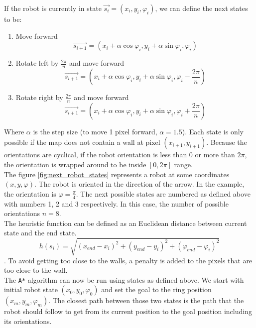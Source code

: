 \documentclass[12pt,a4paper]{article}
\begin{document}
	If the robot is currently in state $\vec{s_i} = (x_i, y_i, \varphi_i)$, we can define the next states to be:
	
	\begin{enumerate}
		\item Move forward
		$$\vec{s_{i+1}} = (x_i + \alpha \cos \varphi_i, y_i + \alpha \sin \varphi_i, \varphi_i)$$
		\item Rotate left by $\frac{2\pi}{n}$ and move forward
		$$\vec{s_{i+1}} = (x_i + \alpha \cos \varphi_i, y_i + \alpha \sin \varphi_i, \varphi_i - \frac{2\pi}{n})$$
		\item Rotate right by $\frac{2\pi}{n}$ and move forward
		$$\vec{s_{i+1}} = (x_i + \alpha \cos \varphi_i, y_i + \alpha \sin \varphi_i, \varphi_i + \frac{2\pi}{n})$$
	\end{enumerate}
	
	Where $\alpha$ is the step size (to move 1 pixel forward, $\alpha = 1.5$). Each state is only possible if the map does not contain a wall at pixel $(x_{i+1}, y_{i+1})$. Because the orientations are cyclical, if the robot orientation is less than $0$ or more than $2\pi$, the orientation is wrapped around to be inside $[0, 2\pi]$ range. \\
	
	The figure \ref{fig:next_robot_states} represents a robot at some coordinates $(x, y, \varphi)$. The robot is oriented in the direction of the arrow. In the example, the orientation is $\varphi = \frac{\pi}{4}$. The next possible states are numbered as defined above with numbers 1, 2 and 3 respectively. In this case, the number of possible orientations $n = 8$. \\
	
	The heuristic function can be defined as an Euclidean distance between current state and the end state. $$h(s_i) = \sqrt{(x_{end} - x_i)^2 + (y_{end} - y_i)^2 + (\varphi_{end} - \varphi_i)^2}$$. To avoid getting too close to the walls, a penalty is added to the pixels that are too close to the wall. \\
	
	The \texttt{A*} algorithm can now be run using states as defined above. We start with initial robot state $(x_0, y_0, \varphi_0)$ and set the goal to the ring position $(x_m, y_m, \varphi_m)$. The closest path between those two states is the path that the robot should follow to get from its current position to the goal position including its orientations. \\
	
\end{document}
